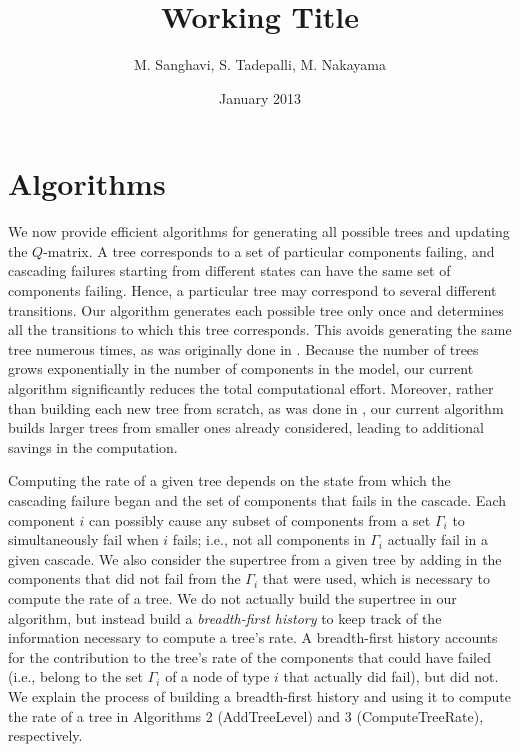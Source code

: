 \documentclass[12pt]{article}
\author{M. Sanghavi, S. Tadepalli, M. Nakayama}
\date{January 2013}
\begin{document}
\title{Working Title}
\maketitle



\section{Algorithms}
\label{sec:alg}

We now provide efficient algorithms for generating all possible trees and updating the $Q$-matrix. A tree corresponds to a set of particular components failing, and cascading failures starting from different states can have the same set of components failing. Hence, a particular tree may correspond to several different transitions. Our algorithm generates each possible tree only once and determines all the transitions to which this tree corresponds.  This avoids generating the same tree numerous times, as was originally done in \cite{}.  Because the number of trees grows exponentially in the number of components in the model, our current algorithm significantly reduces the total computational effort. Moreover, rather than building each new tree from scratch, as was done in \cite{}, our current algorithm builds larger trees from smaller ones already considered, leading to additional savings in the computation. 

Computing the rate of a given tree depends on the state from which the cascading failure began and the set of components that fails in the cascade. Each component $i$ can possibly cause any subset of components from a set $\Gamma_i$ to simultaneously fail when $i$ fails; i.e., not all components in $\Gamma_i$ actually fail in a given cascade. We also consider the supertree from a given tree by adding in the components that did not fail from the $\Gamma_i$ that were used, which is necessary to compute the rate of a tree. We do not actually build the supertree in our algorithm, but instead build a \textit{breadth-first history} to keep track of the information necessary to compute a tree's rate. A breadth-first history accounts for the contribution to the tree's rate of the components that could have failed (i.e., belong to the set $\Gamma_i$ of a node of type $i$ that actually did fail), but did not. We explain the process of building a breadth-first history and using it to compute the rate of a tree in Algorithms 2 (AddTreeLevel) and 3 (ComputeTreeRate), respectively.
\end{document}
